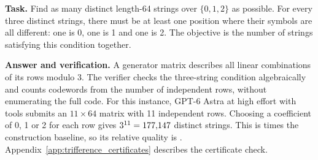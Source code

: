 \begin{taskbox}[mainexample,title={Trifference codes: ternary strings of length 64}]
\textbf{Task.} Find as many distinct length-64 strings over $\{0,1,2\}$ as possible. For every three distinct strings, there must be at least one position where their symbols are all different: one is 0, one is 1 and one is 2. The objective is the number of strings satisfying this condition together.

\textbf{Answer and verification.} A generator matrix describes all linear combinations of its rows modulo 3. The verifier checks the three-string condition algebraically and counts codewords from the number of independent rows, without enumerating the full code. For this instance, GPT-6 Astra at high effort with tools submits an $11\times64$ matrix with 11 independent rows. Choosing a coefficient of 0, 1 or 2 for each row gives $3^{11}=177{,}147$ distinct strings. This is \ToolTriRatio{} times the construction baseline, so its relative quality is \ToolTriRatio{}. Appendix~\ref{app:trifference_certificates} describes the certificate check.
\end{taskbox}
\endgroup
